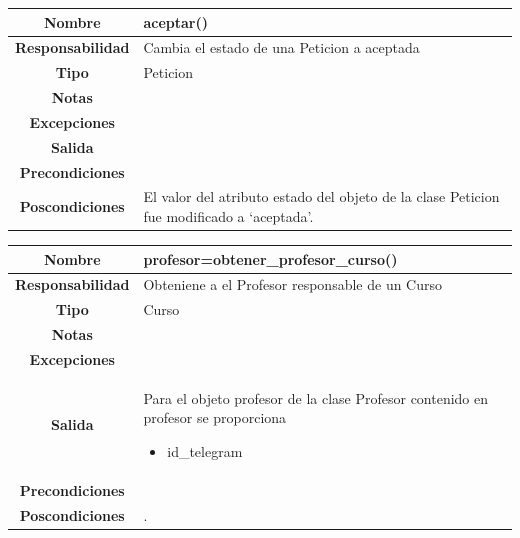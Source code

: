     
                      \begin{table}[!ht]
\begin{tabular}{|c|m{10cm}|}
\hline\rowcolor{Gray}
{\bf Nombre } & {aceptar()}\\
\hline
{\bf Responsabilidad } & {Cambia el estado de una Peticion a aceptada}\\
\hline
\rowcolor{Gray}
{\bf Tipo } & {Peticion} \\
\hline
{\bf Notas } & { } \\
\hline
\rowcolor{Gray}
{\bf Excepciones }& {

} \\
\hline
{\bf Salida }& 
	  { 	
	  } 
 \\
\hline
\rowcolor{Gray}
{\bf Precondiciones }& {}\\
\hline
{\bf Poscondiciones }& { El valor del atributo estado del objeto de la clase Peticion fue modificado a \enquote*{aceptada}.
}  \\
\hline
\end{tabular}

\end{table} 


    
                      \begin{table}[!ht]
\begin{tabular}{|c|m{10cm}|}
\hline\rowcolor{Gray}
{\bf Nombre } & {profesor=obtener\_profesor\_curso()}\\
\hline
{\bf Responsabilidad } & {Obteniene a el Profesor responsable de un Curso}\\
\hline
\rowcolor{Gray}
{\bf Tipo } & {Curso} \\
\hline
{\bf Notas } & { } \\
\hline
\rowcolor{Gray}
{\bf Excepciones }& {

} \\
\hline
{\bf Salida }& 
	  { 	
	  Para el objeto profesor de la clase Profesor contenido en profesor se proporciona
	  \begin{itemize}
	  \item id\_telegram
	  \end{itemize}
	  } 
 \\
\hline
\rowcolor{Gray}
{\bf Precondiciones }& {}\\
\hline
{\bf Poscondiciones }& {}.
  \\
\hline
\end{tabular}

\end{table}
 
